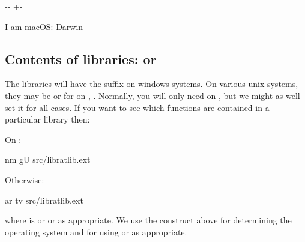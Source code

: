 \documentclass[letterpaper,10pt,english]{sphinxmanual}
\newlength\nbsphinxcodecellspacing
\begin{document}
{

\kern-\sphinxverbatimsmallskipamount\kern-\baselineskip
\kern+\FrameHeightAdjust\kern-\fboxrule
\vspace{\nbsphinxcodecellspacing}

\begin{sphinxVerbatim}[commandchars=\\\{\}]
I am macOS: Darwin
\end{sphinxVerbatim}
}


\subsection{Contents of libraries:  or }
\label{\detokenize{Appendix1:Contents-of-libraries:-nm-or-ar}}
The libraries will have the suffix  on windows systems. On various unix systems, they may be  or for on , . Normally, you will only need  on , but we might as well set it for all
cases. If you want to see which functions are contained in a particular library then:

On :

\begin{sphinxVerbatim}[commandchars=\\\{\}]
nm \PYGZhy{}gU  src/libratlib.\PYGZdl{}\PYGZob{}ext\PYGZcb{}
\end{sphinxVerbatim}

Otherwise:

\begin{sphinxVerbatim}[commandchars=\\\{\}]
ar tv src/libratlib.\PYGZdl{}\PYGZob{}ext\PYGZcb{}
\end{sphinxVerbatim}

where  is  or  or  as appropriate. We use the construct above for determining the operating system and for using  or  as appropriate.
\end{document}
